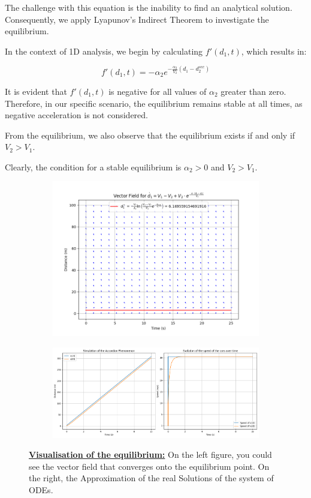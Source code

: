 \documentclass{article}
\begin{document}
	The challenge with this equation is the inability to find an analytical solution. Consequently, we apply Lyapunov's Indirect Theorem to investigate the equilibrium.
	
	In the context of 1D analysis, we begin by calculating $f'(d_1, t)$, which results in:
	
	\[
	f'(d_1, t) = -\alpha_2e^{-\frac{\alpha_2}{V_2}(d_1 - d_{2}^{sec})}
	\]
	
	It is evident that $f'(d_1, t)$ is negative for all values of $\alpha_2$ greater than zero. Therefore, in our specific scenario, the equilibrium remains stable at all times, as negative acceleration is not considered.
	
	From the equilibrium, we also observe that the equilibrium exists if and only if $V_2 > V_1$.
	
	Clearly, the condition for a stable equilibrium is $\alpha_2 > 0$ and $V_2 > V_1$.
	

	
	\begin{figure}[H]
		\centering
		\begin{subfigure}{0.40\textwidth}
			\centering
			\includegraphics[width=\linewidth]{VectorFIeld.png}
		\end{subfigure}
		\hfill
		\begin{subfigure}{0.55\textwidth}
			\centering
			\includegraphics[width=\linewidth]{RealSol.png}
		\end{subfigure}
		\caption{\textbf{\underline{Visualisation of the equilibrium:}} On the left figure, you could see the vector field that converges onto the equilibrium point. On the right, the Approximation of the real Solutions of the system of ODEs.}
		\label{fig:SE3}
	\end{figure}
	
\end{document}
